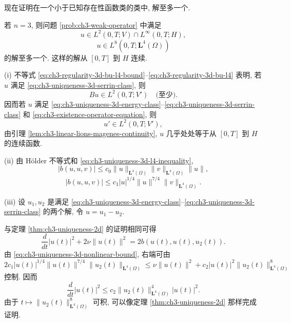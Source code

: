 现在证明在一个小于已知存在性函数类的类中, 解至多一个.

\begin{Theorem}
\label{thm:ch3-uniqueness-3d}
若 $n=3$, 则问题 \ref{prob:ch3-weak-operator} 中满足
\begin{equation}
u\in L^2(0,T;V)\cap L^\infty(0,T;H),
\label{eq:ch3-uniqueness-3d-energy-class}
\end{equation}
\begin{equation}
u\in L^8(0,T;\mathbf L^4(\Omega))
\label{eq:ch3-uniqueness-3d-serrin-class}
\end{equation}
的解至多一个. 这样的解从 $[0,T]$ 到 $H$ 连续.
\end{Theorem}

\begin{Proof}
(i) 不等式 \eqref{eq:ch3-regularity-3d-bu-l4-bound}--\eqref{eq:ch3-regularity-3d-bu-l4} 表明, 若 $u$ 满足 \eqref{eq:ch3-uniqueness-3d-serrin-class}, 则
\begin{equation}
Bu\in L^2(0,T;V')\quad\text{(至少)}.
\label{eq:ch3-uniqueness-3d-bu-l2}
\end{equation}
因而若 $u$ 满足 \eqref{eq:ch3-uniqueness-3d-energy-class}--\eqref{eq:ch3-uniqueness-3d-serrin-class} 和 \eqref{eq:ch3-existence-operator-equation}, 则
\begin{equation}
u'\in L^2(0,T;V'),
\label{eq:ch3-uniqueness-3d-time-regularity}
\end{equation}
由引理 \ref{lem:ch3-linear-lions-magenes-continuity}, $u$ 几乎处处等于从 $[0,T]$ 到 $H$ 的连续函数.

(ii) 由 Hölder 不等式和 \eqref{eq:ch3-uniqueness-3d-l4-inequality},
\[
|b(u,u,v)|\leq c_0\lVert u\rVert_{\mathbf L^4(\Omega)}
\lVert v\rVert_{\mathbf L^4(\Omega)}\lVert u\rVert,
\]
\begin{equation}
|b(u,u,v)|\leq c_1|u|^{1/4}\lVert u\rVert^{7/4}
\lVert v\rVert_{\mathbf L^4(\Omega)}.
\label{eq:ch3-uniqueness-3d-nonlinear-bound}
\end{equation}

(iii) 设 $u_1,u_2$ 是满足 \eqref{eq:ch3-uniqueness-3d-energy-class}--\eqref{eq:ch3-uniqueness-3d-serrin-class} 的两个解, 令 $u=u_1-u_2$.

\hypertarget{chapter-03-page-217}{}
与定理 \ref{thm:ch3-uniqueness-2d} 的证明相同可得
\begin{equation}
\frac d{dt}|u(t)|^2+2\nu\lVert u(t)\rVert^2
=2b(u(t),u(t),u_2(t)).
\label{eq:ch3-uniqueness-3d-difference-energy}
\end{equation}
由 \eqref{eq:ch3-uniqueness-3d-nonlinear-bound}, 右端可由
\[
2c_1|u(t)|^{1/4}\lVert u(t)\rVert^{7/4}
\lVert u_2(t)\rVert_{\mathbf L^4(\Omega)}
\leq\nu\lVert u(t)\rVert^2
+c_2|u(t)|^2\lVert u_2(t)\rVert_{\mathbf L^4(\Omega)}^8
\]
控制. 因而
\[
\frac d{dt}|u(t)|^2
\leq c_2\lVert u_2(t)\rVert_{\mathbf L^4(\Omega)}^4|u(t)|^2.
\]
由于 $t\mapsto\lVert u_2(t)\rVert_{\mathbf L^4(\Omega)}^8$ 可积, 可以像定理 \ref{thm:ch3-uniqueness-2d} 那样完成证明.
\end{Proof}

